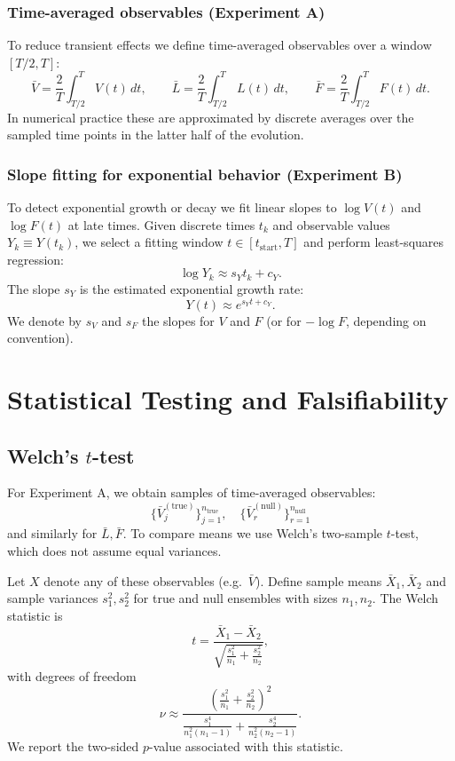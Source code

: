 \documentclass[11pt]{article}
\begin{document}
\subsubsection{Time-averaged observables (Experiment A)}

To reduce transient effects we define time-averaged observables over a window $[T/2, T]$:
\begin{equation}
  \bar V = \frac{2}{T}\int_{T/2}^{T} V(t)\,dt,\qquad
  \bar L = \frac{2}{T}\int_{T/2}^{T} L(t)\,dt,\qquad
  \bar F = \frac{2}{T}\int_{T/2}^{T} F(t)\,dt.
\end{equation}
In numerical practice these are approximated by discrete averages over the sampled time points in the latter half of the evolution.

\subsubsection{Slope fitting for exponential behavior (Experiment B)}

To detect exponential growth or decay we fit linear slopes to $\log V(t)$ and $\log F(t)$ at late times. Given discrete times $t_k$ and observable values $Y_k\equiv Y(t_k)$, we select a fitting window $t\in[t_{\mathrm{start}},T]$ and perform least-squares regression:
\[
\log Y_k \approx s_Y t_k + c_Y.
\]
The slope $s_Y$ is the estimated exponential growth rate:
\begin{equation}
  Y(t) \approx e^{s_Y t + c_Y}.
\end{equation}
We denote by $s_V$ and $s_F$ the slopes for $V$ and $F$ (or for $-\log F$, depending on convention). 

\section{Statistical Testing and Falsifiability}

\subsection{Welch's $t$-test}

For Experiment A, we obtain samples of time-averaged observables:
\[
\{\bar V^{(\mathrm{true})}_j\}_{j=1}^{n_{\mathrm{true}}},\quad
\{\bar V^{(\mathrm{null})}_r\}_{r=1}^{n_{\mathrm{null}}}
\]
and similarly for $\bar L, \bar F$. To compare means we use Welch's two-sample $t$-test, which does not assume equal variances.

Let $X$ denote any of these observables (e.g.\ $\bar V$). Define sample means $\bar X_1,\bar X_2$ and sample variances $s_1^2,s_2^2$ for true and null ensembles with sizes $n_1,n_2$. The Welch statistic is
\[
t = \frac{\bar X_1 - \bar X_2}{\sqrt{\frac{s_1^2}{n_1} + \frac{s_2^2}{n_2}}},
\]
with degrees of freedom
\[
\nu \approx \frac{\left(\frac{s_1^2}{n_1}+\frac{s_2^2}{n_2}\right)^2}{
\frac{s_1^4}{n_1^2(n_1-1)} + \frac{s_2^4}{n_2^2(n_2-1)}}.
\]
We report the two-sided $p$-value associated with this statistic.
\end{document}
